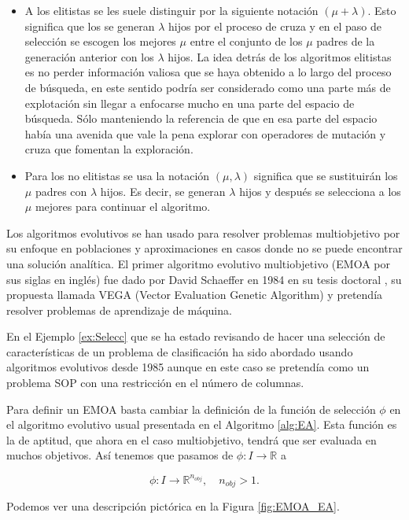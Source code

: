 \begin{itemize}
    \item A los elitistas se les suele distinguir por la siguiente notación $(\mu+\lambda)$. Esto significa que los se generan $\lambda$ hijos por el proceso de cruza y en el paso de selección se escogen los mejores $\mu$ entre el conjunto de los $\mu$ padres de la generación anterior con los $\lambda$ hijos. La idea detrás de los algoritmos elitistas es no perder información valiosa que se haya obtenido a lo largo del proceso de búsqueda, en este sentido podría ser considerado como una parte más de explotación sin llegar a enfocarse mucho en una parte del espacio de búsqueda. Sólo manteniendo la referencia de que en esa parte del espacio había una avenida que vale la pena explorar con operadores de mutación y cruza que fomentan la exploración.
    \item Para los no elitistas se usa la notación $(\mu,\lambda)$ significa que se sustituirán los $\mu$ padres con $\lambda$ hijos. Es decir, se generan $\lambda$ hijos y después se selecciona a los $\mu$ mejores para continuar el algoritmo.  
\end{itemize}
    
Los algoritmos evolutivos se han usado para resolver problemas multiobjetivo por su enfoque en poblaciones y aproximaciones en casos donde no se puede encontrar una solución analítica. El primer algoritmo evolutivo multiobjetivo (EMOA por sus siglas en inglés) fue dado por David Schaeffer en 1984 en su tesis doctoral \cite{schafferMultipleObjectiveOptimization1984}, su propuesta llamada VEGA (Vector Evaluation Genetic Algorithm) y pretendía resolver problemas de aprendizaje de máquina.

En el Ejemplo \ref{ex:Selecc} que se ha estado revisando de hacer una selección de características de un problema de clasificación  ha sido abordado usando algoritmos evolutivos desde 1985 \cite{SIEDLECKI1989335} aunque en este caso se pretendía como un problema SOP con una restricción en el número de columnas. 


Para definir un EMOA basta cambiar la definición de la función de selección $\phi$ en el algoritmo evolutivo usual presentada en el Algoritmo \ref{alg:EA}. Esta función es la de aptitud, que ahora en el caso multiobjetivo, tendrá que ser evaluada en muchos objetivos. Así tenemos que pasamos de $\phi:I\rightarrow \mathbb{R}$ a

$$\phi:I\rightarrow \mathbb{R}^{n_{obj}}, \quad n_{obj}>1.$$


Podemos ver una descripción pictórica en la Figura \ref{fig:EMOA_EA}.

